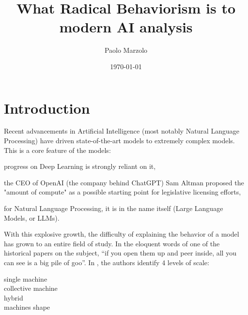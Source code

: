 \documentclass[letterpaper,11pt,twocolumn]{article}
\title{What Radical Behaviorism is to modern AI analysis}
\author{Paolo Marzolo}
\date{\today}
\begin{document}

\section*{Introduction}
Recent advancements in Artificial Intelligence (most notably Natural Language Processing) have driven state-of-the-art models to extremely complex models. This is a core feature of the models:
\begin{inlinelist}
    \item progress on Deep Learning is strongly reliant on it\cite{thompsonComputationalLimitsDeep2022},
    \item the CEO of OpenAI (the company behind ChatGPT) Sam Altman proposed the "amount of compute" as a possible starting point for legislative licensing efforts,
    \item for Natural Language Processing, it is in the name itself (Large Language Models, or LLMs).
\end{inlinelist}
With this explosive growth, the difficulty of explaining the behavior of a model has grown to an entire field of study. In the eloquent words of one of the historical papers on the subject, \enquote{if
    you open them up and peer inside, all you can see is a big pile of goo}\cite{mozerUsingRelevanceReduce1989a}.
In \cite{rahwanMachineBehaviour2019}, the authors identify 4 levels of scale:
\begin{description}
    \item[single machine]
    \item[collective machine]
    \item[hybrid]
    \item[machines shape]
\end{description}
\end{document}
